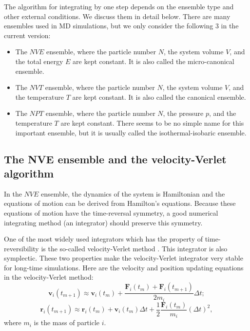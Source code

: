 \documentclass[12pt,a4paper]{report}
\newcommand{\vect}[1]{\boldsymbol{#1}}
\begin{document}
The algorithm for integrating by one step depends on the ensemble type and other external conditions. We discuss them in detail below. There are many ensembles used in MD simulations, but we only consider the following 3 in the current version:
\begin{itemize}
\item The $NVE$ ensemble, where the particle number $N$, the system volume $V$, and the total energy $E$ are kept constant. It is also called the micro-canonical ensemble.
\item The $NVT$ ensemble, where the particle number $N$, the system volume $V$, and the temperature $T$ are kept constant. It is also called the canonical ensemble.
\item The $NPT$ ensemble, where the particle number $N$, the pressure $p$, and the temperature $T$ are kept constant. There seems to be no simple name for this important ensemble, but it is usually called the isothermal-isobaric ensemble.
\end{itemize}




\subsection{The NVE ensemble and the velocity-Verlet algorithm}

In the $NVE$ ensemble, the dynamics of the system is Hamiltonian and the equations of motion can be derived from Hamilton's equations. Because these equations of motion have the time-reversal symmetry, a good numerical integrating method (an integrator) should preserve this symmetry.

One of the most widely used integrators which has the property of time-reversibility is the so-called velocity-Verlet method \cite{swope1982jcp}. This integrator is also symplectic. These two properties make the velocity-Verlet integrator very stable for long-time simulations. Here are the velocity and position updating equations in the velocity-Verlet method:
\begin{equation}
\label{equation:velocity-Verlet-velocity}
\vect{v}_i(t_{m+1}) \approx \vect{v}_i(t_{m}) +
\frac{\vect{F}_i(t_m)+\vect{F}_i(t_{m+1})}{2m_i}\Delta t;
\end{equation}
\begin{equation}
\label{equation:velocity-Verlet-position}
\vect{r}_i(t_{m+1}) \approx \vect{r}_i(t_{m}) +
\vect{v}_i(t_m) \Delta t
+ \frac{1}{2} \frac{\vect{F}_i(t_m)}{m_i} (\Delta t)^2,
\end{equation}
where $m_i$ is the mass of particle $i$.
\end{document}
